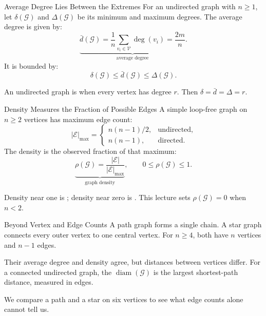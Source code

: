 \documentclass[aspectratio=169,11pt]{beamer}
\begin{document}
\begin{frame}{Average Degree Lies Between the Extremes}
  For an undirected graph with $n\geq1$, let $\delta(\mathcal G)$ and
  $\Delta(\mathcal G)$ be its minimum and maximum degrees.
  The average degree is given by:
  \[
    \underbrace{\bar d(\mathcal G)=\frac{1}{n}
      \sum_{v_i\in\mathcal V}\deg(v_i)=\frac{2m}{n}}_{\text{average degree}}.
  \]
  It is bounded by:
  \[
    \delta(\mathcal G)\leq\bar d(\mathcal G)\leq\Delta(\mathcal G).
  \]

  An undirected graph is  when every vertex has
  degree $r$. Then $\delta=\bar d=\Delta=r$.
\end{frame}

\begin{frame}{Density Measures the Fraction of Possible Edges}
  A simple loop-free graph on $n\geq2$ vertices has maximum edge count:
  \[
    |\mathcal E|_{\max}=
    \begin{cases}
      n(n-1)/2, & \text{undirected},\\
      n(n-1), & \text{directed}.
    \end{cases}
  \]
  The density is the observed fraction of that maximum:
  \[
    \underbrace{\rho(\mathcal G)=\frac{|\mathcal E|}{|\mathcal E|_{\max}}}_{\text{graph density}},
    \qquad 0\leq\rho(\mathcal G)\leq1.
  \]

  Density near one is ; density near zero is .
  This lecture sets $\rho(\mathcal G)=0$ when $n<2$.
\end{frame}

\begin{frame}{Beyond Vertex and Edge Counts}
  A path graph forms a single chain. A star graph connects every outer vertex
  to one central vertex. For $n\geq4$, both have $n$ vertices and $n-1$ edges.

  \vspace{0.8em}
  Their average degree and density agree, but distances between vertices differ.
  For a connected undirected graph, the 
  $\operatorname{diam}(\mathcal G)$ is the largest shortest-path distance,
  measured in edges.

  \vspace{0.8em}
  We compare a path and a star on six vertices to see what edge counts alone
  cannot tell us.
\end{frame}
\end{document}
